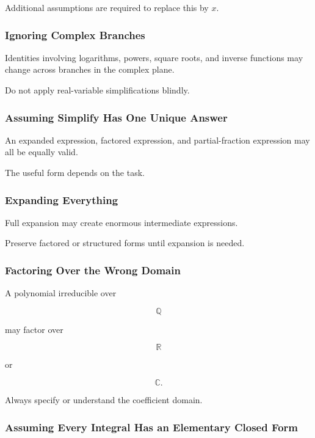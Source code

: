 Additional assumptions are required to replace this by \(x\).

\subsubsection{Ignoring Complex Branches}

Identities involving logarithms, powers, square roots, and inverse
functions may change across branches in the complex plane.

Do not apply real-variable simplifications blindly.

\subsubsection{Assuming Simplify Has One Unique Answer}

An expanded expression, factored expression, and partial-fraction
expression may all be equally valid.

The useful form depends on the task.

\subsubsection{Expanding Everything}

Full expansion may create enormous intermediate expressions.

Preserve factored or structured forms until expansion is needed.

\subsubsection{Factoring Over the Wrong Domain}

A polynomial irreducible over

\[
\mathbb{Q}
\]

may factor over

\[
\mathbb{R}
\]

or

\[
\mathbb{C}.
\]

Always specify or understand the coefficient domain.

\subsubsection{Assuming Every Integral Has an Elementary Closed Form}

